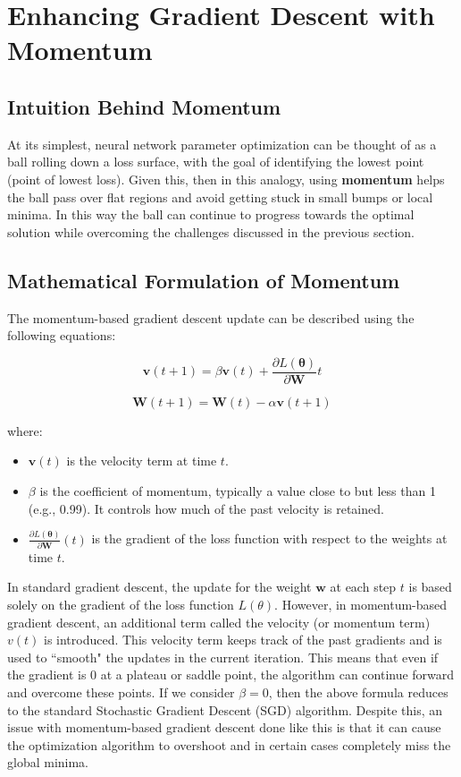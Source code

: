 \documentclass{article}
\begin{document}
\section{Enhancing Gradient Descent with Momentum}

\subsection{Intuition Behind Momentum}

At its simplest, neural network parameter optimization can be thought of as a ball rolling down a loss surface, with the goal of identifying the lowest point (point of lowest loss). Given this, then in this analogy, using \textbf{momentum} helps the ball pass over flat regions and avoid getting stuck in small bumps or local minima. In this way the ball can continue to progress towards the optimal solution while overcoming the challenges discussed in the previous section.

\subsection{Mathematical Formulation of Momentum}
The momentum-based gradient descent update can be described using the following equations:

\[
\mathbf{v}(t+1) = \beta \mathbf{v}(t) + \frac{\partial L(\boldsymbol{\theta})}{\partial \mathbf{W}} t
\]

\[
\mathbf{W}(t+1) = \mathbf{W}(t) - \alpha \mathbf{v}(t+1)
\]

where:
\begin{itemize}
    \item \( \mathbf{v}(t) \) is the velocity term at time \( t \).
    \item \( \beta \) is the coefficient of momentum, typically a value close to but less than 1 (e.g., 0.99). It controls how much of the past velocity is retained.
    \item \( \frac{\partial L(\boldsymbol{\theta})}{\partial \mathbf{W}} (t)\) is the gradient of the loss function with respect to the weights at time \( t \).
\end{itemize}

\noindent In standard gradient descent, the update for the weight \( \mathbf{w} \) at each step $t$ is based solely on the gradient of the loss function $L(\theta)$. However, in momentum-based gradient descent, an additional term called the velocity (or momentum term) 
$v(t)$ is introduced. This velocity term keeps track of the past gradients and is used to ``smooth" the updates in the current iteration. This means that even if the gradient is 0 at a plateau or saddle point, the algorithm can continue forward and overcome these points. If we consider $\beta = 0 $, then the above formula reduces to the standard Stochastic Gradient Descent (SGD) algorithm. Despite this, an issue with momentum-based gradient descent done like this is that it can cause the optimization algorithm to overshoot and in certain cases completely miss the global minima.
\end{document}
